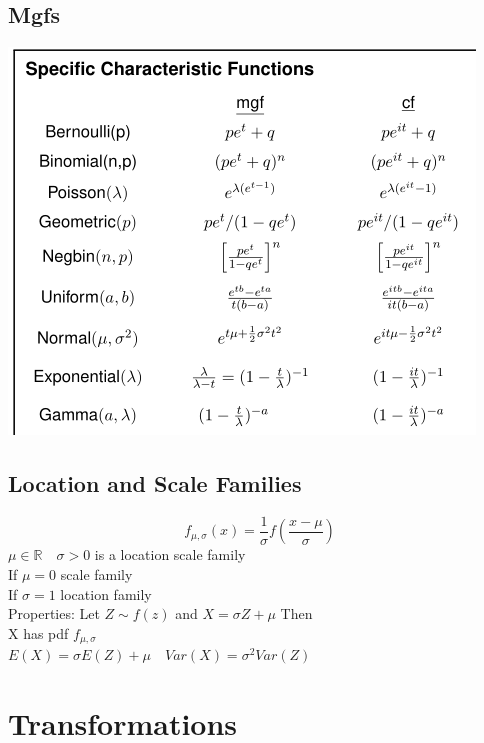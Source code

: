 \documentclass[openany]{book}
\begin{document}
\begin{flushleft}
\section{Mgfs}
\includegraphics[scale=1]{mgfchar.png}
\section{Location and Scale Families}
\[f_{\mu,\sigma}(x)=\dfrac{1}{\sigma}f\left(\dfrac{x-\mu}{\sigma} \right)
\]
$\mu \in \mathbb{R} \quad \sigma>0$ is a location scale family\\
If $\mu=0$ scale family\\
If $\sigma=1$ location family\\
Properties: Let $Z\sim f(z)$ and $X=\sigma Z+\mu$ Then\\
X has pdf $f_{\mu,\sigma}$\\
$E(X)=\sigma E(Z)+\mu \quad Var(X)=\sigma^2 Var(Z)$
\chapter{Transformations}

\end{flushleft}
\end{document}
